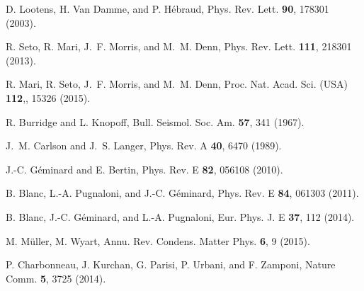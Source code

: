 \documentclass[prl,twocolumn,floats,floatfix,aps,superscriptaddress,showpacs]{revtex4-1}
\begin{document}
\begin{thebibliography}{99}
D. Lootens, H. Van Damme, and P. H\'ebraud, Phys. Rev. Lett. {\bf 90}, 178301 (2003).

R. Seto, R. Mari, J.~F. Morris, and M.~M. Denn, Phys. Rev. Lett. {\bf 111}, 218301 (2013).

R. Mari, R. Seto, J.~F. Morris, and M.~M. Denn, Proc. Nat. Acad. Sci. (USA) {\bf 112},, 15326 (2015).

R. Burridge and L. Knopoff, Bull. Seismol. Soc. Am. {\bf 57}, 341 (1967). 

J.~M. Carlson and J.~S. Langer, Phys. Rev. A {\bf 40}, 6470 (1989).

J.-C. G\'eminard and E. Bertin, Phys. Rev. E {\bf 82}, 056108 (2010).

B. Blanc, L.-A. Pugnaloni, and J.-C. G\'eminard, Phys. Rev. E {\bf 84}, 061303 (2011).

B. Blanc, J.-C. G\'eminard, and L.-A. Pugnaloni, Eur. Phys. J. E {\bf 37}, 112 (2014).

M. M\"uller, M. Wyart, Annu. Rev. Condens. Matter Phys. {\bf 6}, 9 (2015).

P. Charbonneau, J. Kurchan, G. Parisi, P. Urbani, and F. Zamponi, 
Nature Comm. {\bf 5},  3725 (2014).



\end{thebibliography}
\end{document}
